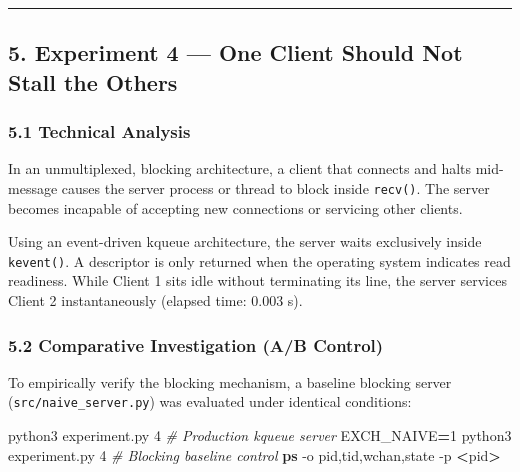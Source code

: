 \documentclass[
]{article}
\newenvironment{Shaded}{\begin{snugshade}}{\end{snugshade}}
\newcommand{\AttributeTok}[1]{\textcolor[rgb]{0.13,0.29,0.53}{#1}}
\newcommand{\CommentTok}[1]{\textcolor[rgb]{0.56,0.35,0.01}{\textit{#1}}}
\newcommand{\ExtensionTok}[1]{#1}
\newcommand{\FunctionTok}[1]{\textcolor[rgb]{0.13,0.29,0.53}{\textbf{#1}}}
\newcommand{\NormalTok}[1]{#1}
\newcommand{\OperatorTok}[1]{\textcolor[rgb]{0.81,0.36,0.00}{\textbf{#1}}}
\newcommand{\VariableTok}[1]{\textcolor[rgb]{0.00,0.00,0.00}{#1}}
\begin{document}
\begin{center}\rule{0.5\linewidth}{0.5pt}\end{center}

\hypertarget{experiment-4-one-client-should-not-stall-the-others}{%
\subsection{5. Experiment 4 --- One Client Should Not Stall the
Others}\label{experiment-4-one-client-should-not-stall-the-others}}

\hypertarget{technical-analysis-3}{%
\subsubsection{5.1 Technical Analysis}\label{technical-analysis-3}}

In an unmultiplexed, blocking architecture, a client that connects and
halts mid-message causes the server process or thread to block inside
\texttt{recv()}. The server becomes incapable of accepting new
connections or servicing other clients.

Using an event-driven kqueue architecture, the server waits exclusively
inside \texttt{kevent()}. A descriptor is only returned when the
operating system indicates read readiness. While Client 1 sits idle
without terminating its line, the server services Client 2
instantaneously (elapsed time: 0.003 s).

\hypertarget{comparative-investigation-ab-control}{%
\subsubsection{5.2 Comparative Investigation (A/B
Control)}\label{comparative-investigation-ab-control}}

To empirically verify the blocking mechanism, a baseline blocking server
(\texttt{src/naive\_server.py}) was evaluated under identical
conditions:

\begin{Shaded}
\begin{Highlighting}[]
\ExtensionTok{python3}\NormalTok{ experiment.py 4                       }\CommentTok{\# Production kqueue server}
\VariableTok{EXCH\_NAIVE}\OperatorTok{=}\NormalTok{1 }\ExtensionTok{python3}\NormalTok{ experiment.py 4          }\CommentTok{\# Blocking baseline control}
\FunctionTok{ps} \AttributeTok{{-}o}\NormalTok{ pid,tid,wchan,state }\AttributeTok{{-}p} \OperatorTok{\textless{}}\NormalTok{pid}\OperatorTok{\textgreater{}}
\end{Highlighting}
\end{Shaded}
\end{document}
